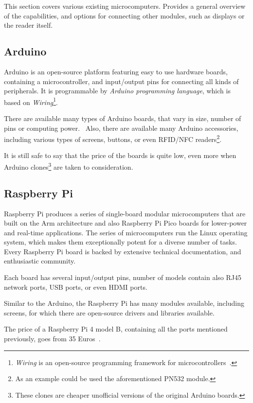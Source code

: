 This section covers various existing microcomputers. Provides a general overview of the capabilities, and options for connecting other modules, such as displays or the reader itself.


\subsection{Arduino}

Arduino is an open-source platform featuring easy to use hardware boards, containing a microcontroller, and input/output pins for connecting all kinds of peripherals. It is programmable by \emph{Arduino programming language}, which is based on \emph{Wiring}\footnote{\emph{Wiring} is an open-source programming framework for microcontrollers~\cite{wiring}.}.~\cite{arduino}

There are available many types of Arduino boards, that vary in size, number of pins or computing power.~\cite{arduinohardware} Also, there are available many Arduino accessories, including various types of screens, buttons, or even RFID/NFC readers\footnote{As an example could be used the aforementioned PN532 module.}. 

It is still safe to say that the price of the boards is quite low, even more when Arduino clones\footnote{These clones are cheaper unofficial versions of the original Arduino boards.} are taken to consideration.


\subsection{Raspberry Pi}

Raspberry Pi produces a series of single-board modular microcomputers that are built on the Arm architecture and also Raspberry Pi Pico boards for lower-power and real-time applications. The series of microcomputers run the Linux operating system, which makes them exceptionally potent for a diverse number of tasks. Every Raspberry Pi board is backed by extensive technical documentation, and enthusiastic community.~\cite{raspberry}

Each board has several input/output pins, number of models contain also RJ45 network ports, USB ports, or even HDMI ports.

Similar to the Arduino, the Raspberry Pi has many modules available, including screens, for which there are open-source drivers and libraries available.

The price of a Raspberry Pi 4 model B, containing all the ports mentioned previously, goes from 35 Euros~\cite{raspberryshop}.


